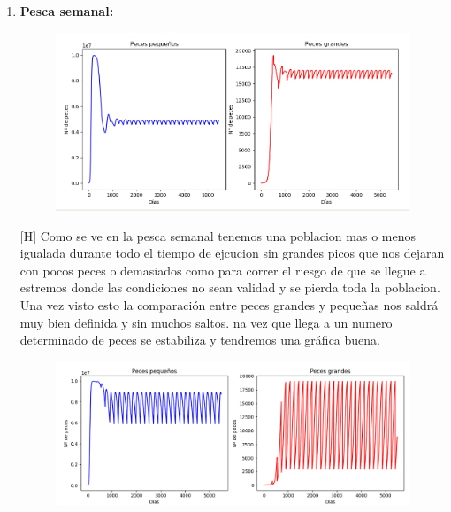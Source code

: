 \documentclass[]{article}
\begin{document}
\begin{enumerate}
	\item \textbf{Pesca semanal:}
	\begin{figure}[H]
		\centering
		\includegraphics[width=1\linewidth]{img/screenshot0026}
		\caption{}
		\label{fig:screenshot0026}
	\end{figure}[H]
	Como se ve en la pesca semanal tenemos una poblacion mas o menos igualada durante todo el tiempo de ejcucion sin grandes picos que nos dejaran con pocos peces o demasiados como para correr el riesgo de que se llegue a estremos donde las condiciones no sean validad y se pierda toda la poblacion.
	Una vez visto esto la comparación entre peces grandes y pequeñas nos saldrá muy bien definida y sin muchos saltos. na vez que llega a un numero determinado de peces se estabiliza y tendremos una gráfica buena. 
	\begin{figure}[H]
		\centering
		\includegraphics[width=1\linewidth]{img/screenshot0028}
		\caption{}
		\label{fig:screenshot0028}
	\end{figure}


\end{enumerate}
\end{document}

